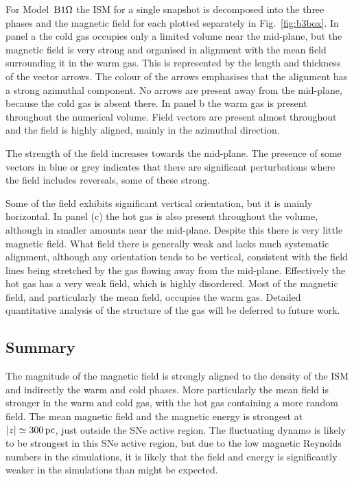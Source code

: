 \documentclass[useAMS,usenatbib]{mn2e}
\begin{document}

For Model~${\mathrm{B}1\rm{\Omega} }$ the ISM for a single snapshot is decomposed into the  three phases and the magnetic field for each plotted separately in  Fig.~\ref{fig:b3box}.
In panel a the cold gas occupies only a limited volume near the mid-plane,  but the magnetic field is very strong and organised in alignment with the  mean field surrounding it in the warm gas. This is represented by the length and thickness of the vector arrows. The colour of the arrows emphasises that the alignment has a strong azimuthal component. No arrows are present away from the mid-plane, because the cold gas is absent there.
In panel b the warm gas is present throughout the numerical volume.
Field vectors are present almost throughout and the field is highly aligned, 
mainly in the azimuthal direction. 

The strength of the field increases towards the mid-plane. The presence of some vectors in blue or grey indicates that there are significant perturbations where the field includes reversals, some of these strong.

Some of the field exhibits significant vertical orientation, but it is mainly horizontal.
In panel (c) the hot gas is also present throughout the volume, although in smaller amounts near the mid-plane. Despite this there is very little magnetic field. What field there is generally weak and lacks much systematic alignment, although any orientation tends to be vertical, consistent with the field lines being stretched by the gas flowing away from the mid-plane. Effectively the hot gas has a very weak field, which is highly disordered. Most of the magnetic field, and particularly the mean field, occupies the warm gas.
Detailed quantitative analysis of the structure of the gas will be deferred to future work.

\subsection{Summary}

The magnitude of the magnetic field is strongly aligned to the density of the ISM and indirectly the warm and cold phases. More particularly the mean field is stronger in the warm and cold gas, with the hot gas containing a more random field. The mean magnetic field and the magnetic energy is strongest at $|z|\simeq300\,{\rm pc}$, just outside the SNe active region. 
The fluctuating dynamo is likely to be strongest in this SNe active region, 
but due to the low magnetic Reynolds numbers in the simulations, it is likely that the field and energy is significantly weaker in the simulations than might be expected.
\end{document}
